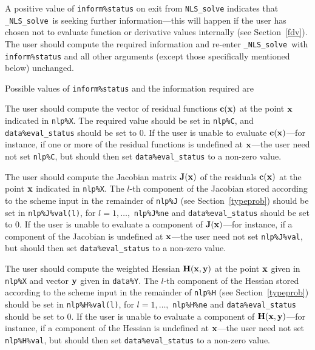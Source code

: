 \documentclass{galahad}
\newcommand{\packagename}{NLS}
\newcommand{\fullpackagename}{\libraryname\_\packagename}
\newcommand{\solver}{{\tt \fullpackagename\_solve}}
\begin{document}
A positive value of {\tt inform\%status} on exit from
{\tt \packagename\_solve}
indicates that
\solver\ is seeking further information---this will happen
if the user has chosen not to evaluate function or
derivative values internally (see Section~\ref{fdv}).
The user should compute the required information and re-enter \solver\
with {\tt inform\%status} and all other arguments (except those specifically
mentioned below) unchanged.

Possible values of {\tt inform\%status} and the information required are
\begin{description}
 The user should compute the vector of residual functions
     ${\mathbf{c}}({\mathbf{x}})$ at the point ${\mathbf{x}}$ indicated in {\tt nlp\%X}.
     The required value should be set in {\tt nlp\%C}, and
     {\tt data\%eval\_status} should be set to 0. If the user is
     unable to evaluate ${\mathbf{c}}({\mathbf{x}})$---for instance, if one or more of the
     residual functions is undefined at ${\mathbf{x}}$---the user need not set
     {\tt nlp\%C}, but should then set {\tt data\%eval\_status}
     to a non-zero value.

 The user should compute the Jacobian matrix ${\mathbf{J}}({\mathbf{x}})$ of the
     residuals ${\mathbf{c}}({\mathbf{x}})$ at the point ${\mathbf{x}}$ indicated in {\tt nlp\%X}.
     The $l$-th component of the Jacobian stored according to the
     scheme input in the remainder of {\tt nlp\%J} (see Section~\ref{typeprob})
     should be set in {\tt nlp\%J\%val(l)}, for $l = 1, \ldots,$
     {\tt  nlp\%J\%ne} and {\tt data\%eval\_status} should be set to 0.
     If the user is unable to  evaluate a component of ${\mathbf{J}}({\mathbf{x}})$---for
     instance, if a component of the Jacobian is
     undefined at ${\mathbf{x}}$---the user need not set {\tt nlp\%J\%val}, but
     should then set {\tt data\%eval\_status} to a non-zero value.

 The user should compute the weighted Hessian ${\mathbf{H}}({\mathbf{x}},{\mathbf{y}})$
     at the point ${\mathbf{x}}$ given in {\tt nlp\%X} and vector ${\mathbf{y}}$ given in
     {\tt data\%Y}. The $l$-th component of the Hessian stored
     according to the scheme input in the remainder of {\tt nlp\%H}
     (see Section~\ref{typeprob}) should be set in {\tt nlp\%H\%val(l)},
     for $l = 1, \ldots,$ {\tt  nlp\%H\%ne} and
     {\tt data\%eval\_status} should be set to 0. If the user is
     unable to evaluate a component of ${\mathbf{H}}({\mathbf{x}},{\mathbf{y}})$---for instance,
     if a component of the Hessian is
     undefined at ${\mathbf{x}}$---the user need not set {\tt nlp\%H\%val}, but
     should then set {\tt data\%eval\_status} to a non-zero value.


\end{description}
\end{document}
